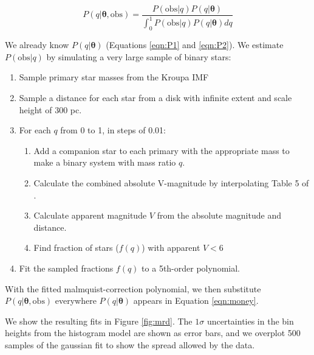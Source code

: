 \documentclass{emulateapj}
\renewcommand{\vec}[1]{\bm{#1}}
\begin{document}
\begin{equation}
P(q|\vec{\theta}, \mathrm{obs}) = \frac{P(\mathrm{obs}|q) P(q|\vec{\theta})}{\int_0^1 P(\mathrm{obs}|q) P(q|\vec{\theta}) dq}
\end{equation}

We already know $P(q|\vec{\theta})$ (Equations \ref{eqn:P1} and \ref{eqn:P2}). We estimate $P(\mathrm{obs}|q)$ by simulating a very large sample of binary stars:

\begin{enumerate}
\item Sample primary star masses from the Kroupa IMF \citep{Kroupa2002}
\item Sample a distance for each star from a disk with infinite extent and scale height of $300$ pc. 
\item For each $q$ from 0 to 1, in steps of 0.01:
\begin{enumerate}
  \item Add a companion star to each primary with the appropriate mass to make a binary system with mass ratio $q$.
  \item Calculate the combined absolute V-magnitude by interpolating Table 5 of \citet{Pecaut2013}.
  \item Calculate apparent magnitude $V$ from the absolute magnitude and distance.
  \item Find fraction of stars ($f(q)$) with apparent $V < 6$
\end{enumerate}
\item Fit the sampled fractions $f(q)$ to a 5th-order polynomial.
\end{enumerate}

With the fitted malmquist-correction polynomial, we then substitute $P(q|\vec{\theta}, \mathrm{obs})$ everywhere $P(q|\vec{\theta})$ appears in Equation \ref{eqn:money}.

We show the resulting fits in Figure \ref{fig:mrd}. The $1\sigma$ uncertainties in the bin heights from the histogram model are shown as error bars, and we overplot 500 samples of the gaussian fit to show the spread allowed by the data. 
\end{document}
